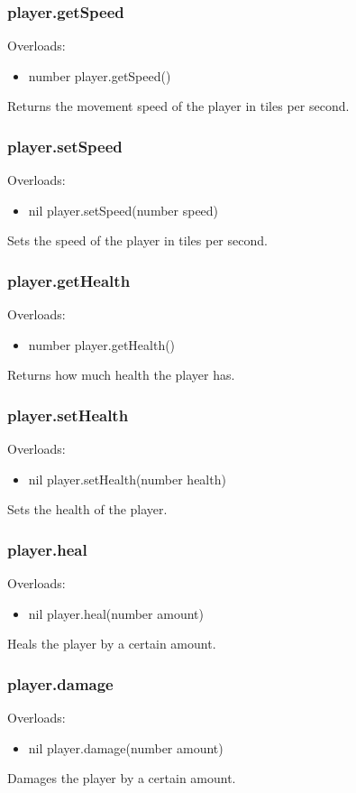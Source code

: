 \documentclass{book}
\newenvironment{ulist}
	{\begin{itemize}
			\itemsep0em}
	{\end{itemize}}
\begin{document}
\subsubsection{player.getSpeed}
Overloads:
\begin{ulist}
	\item number player.getSpeed()
\end{ulist}
Returns the movement speed of the player in tiles per second.

\subsubsection{player.setSpeed}
Overloads:
\begin{ulist}
	\item nil player.setSpeed(number speed)
\end{ulist}
Sets the speed of the player in tiles per second.

\subsubsection{player.getHealth}
Overloads:
\begin{ulist}
	\item number player.getHealth()
\end{ulist}
Returns how much health the player has.

\subsubsection{player.setHealth}
Overloads:
\begin{ulist}
	\item nil player.setHealth(number health)
\end{ulist}
Sets the health of the player.

\subsubsection{player.heal}
Overloads:
\begin{ulist}
	\item nil player.heal(number amount)
\end{ulist}
Heals the player by a certain amount.

\subsubsection{player.damage}
Overloads:
\begin{ulist}
	\item nil player.damage(number amount)
\end{ulist}
Damages the player by a certain amount.
\end{document}
